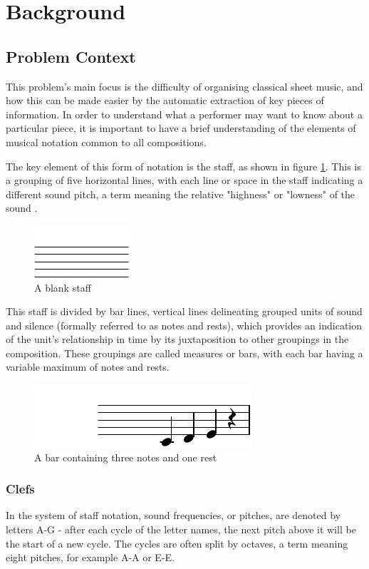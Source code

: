 \section{Background}
\subsection{Problem Context}
This problem's main focus is the difficulty of organising classical sheet music, and how this can be made easier by the automatic extraction of key pieces  of information. In order to understand what a performer may want to know about a particular piece, it is important to have a brief understanding of the elements of musical notation common to all compositions.

The key element of this form of notation is the staff, as shown in figure \ref{fig:staff}. This is a grouping of five horizontal lines, with each line or space in the staff indicating a different sound pitch, a term meaning the relative "highness" or "lowness" of the sound \parencite{classroom}.

\begin{figure}[h]
    \centering
        \includegraphics{staff-crop.pdf}
    \caption{A blank staff}
    \label{fig:staff}
\end{figure}

This staff is divided by bar lines, vertical lines delineating grouped units of sound and silence (formally referred to as notes and rests), which provides an indication of the unit's relationship in time by its juxtaposition to other groupings in the composition. These groupings are called measures or bars, with each bar having a variable maximum of notes and rests. 

\begin{figure}[h]
    \centering
        \includegraphics{bar_with_notes-crop.pdf}
    \caption{A bar containing three notes and one rest}
    \label{fig:staff-notes}
\end{figure}
\subsubsection{Clefs}
In the system of staff notation, sound frequencies, or pitches, are denoted by letters A-G - after each cycle of the letter names, the next pitch above it will be the start of a new cycle. The cycles are often split by octaves, a term meaning eight pitches, for example A-A or E-E. 

